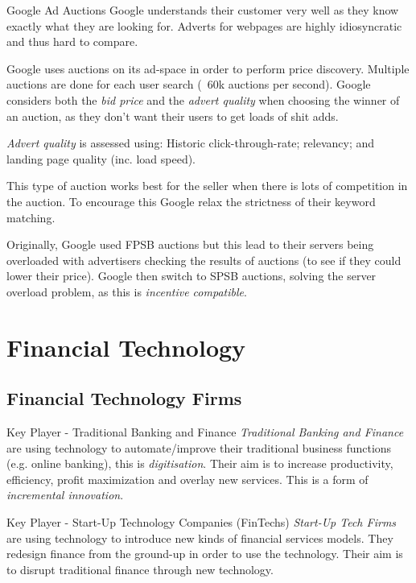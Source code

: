 \documentclass[11pt,a4paper]{article}
\begin{document}
\begin{remark}{Google Ad Auctions}
  Google understands their customer very well as they know exactly what they are looking for. Adverts for webpages are highly idiosyncratic and thus hard to compare.
  \par Google uses auctions on its ad-space in order to perform price discovery. Multiple auctions are done for each user search (~60k auctions per second). Google considers both the \textit{bid price} and the \textit{advert quality} when choosing the winner of an auction, as they don't want their users to get loads of shit adds.
  \par \textit{Advert quality} is assessed using: Historic click-through-rate; relevancy; and landing page quality (inc. load speed).
  \par This type of auction works best for the seller when there is lots of competition in the auction. To encourage this Google relax the strictness of their keyword matching.
  \par Originally, Google used FPSB auctions but this lead to their servers being overloaded with advertisers checking the results of auctions (to see if they could lower their price). Google then switch to SPSB auctions, solving the server overload problem, as this is \textit{incentive compatible}.
\end{remark}

\section{Financial Technology}

\subsection{Financial Technology Firms}

\begin{proposition}{Key Player - Traditional Banking and Finance}
  \textit{Traditional Banking and Finance} are using technology to automate/improve their traditional business functions (e.g. online banking), this is \textit{digitisation}. Their aim is to increase productivity, efficiency, profit maximization and overlay new services. This is a form of \textit{incremental innovation}.
\end{proposition}

\begin{proposition}{Key Player - Start-Up Technology Companies (FinTechs)}
  \textit{Start-Up Tech Firms} are using technology to introduce new kinds of financial services models. They redesign finance from the ground-up in order to use the technology. Their aim is to disrupt traditional finance through new technology.
\end{proposition}
\end{document}
